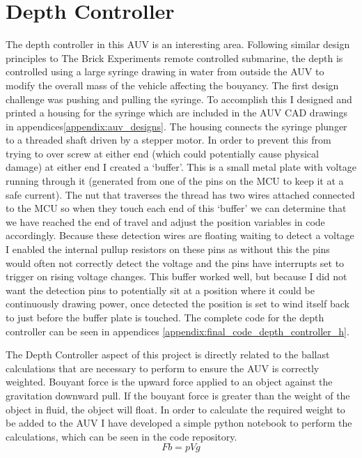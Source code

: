 \documentclass[11pt,a4paper,titlepage]{report}
\begin{document}
	\section*{Depth Controller}
	The depth controller in this AUV is an interesting area. Following similar design principles to The Brick Experiments remote controlled submarine, the depth is controlled using a large syringe drawing in water from outside the AUV to modify the overall mass of the vehicle affecting the bouyancy. The first design challenge was pushing and pulling the syringe. To accomplish this I designed and printed a housing for the syringe which are included in the AUV CAD drawings in appendices\ref{appendix:auv_designs}. The housing connects the syringe plunger to a threaded shaft driven by a stepper motor. In order to prevent this from trying to over screw at either end (which could potentially cause physical damage) at either end I created a `buffer'. This is a small metal plate with voltage running through it (generated from one of the pins on the MCU to keep it at a safe current). The nut that traverses the thread has two wires attached connected to the MCU so when they touch each end of this `buffer' we can determine that we have reached the end of travel and adjust the position variables in code accordingly. Because these detection wires are floating waiting to detect a voltage I enabled the internal pullup resistors on these pins as without this the pins would often not correctly detect the voltage and the pins have interrupts set to trigger on rising voltage changes. This buffer worked well, but because I did not want the detection pins to potentially sit at a position where it could be continuously drawing power, once detected the position is set to wind itself back to just before the buffer plate is touched. The complete code for the depth controller can be seen in appendices \ref{appendix:final_code_depth_controller_h}.
	
	The Depth Controller aspect of this project is directly related to the ballast calculations that are necessary to perform to ensure the AUV is correctly weighted. Bouyant force\cite{BOUYANT_FORCE} is the upward force applied to an object against the gravitation downward pull. If the bouyant force is greater than the weight of the object in fluid, the object will float\cite{ARCHIMEDES_PRINCIPLE}. In order to calculate the required weight to be added to the AUV I have developed a simple python notebook to perform the calculations, which can be seen in the code repository\cite{AUV_REPO}. 
	$$
	Fb = pVg
	$$ 
	
\end{document}
